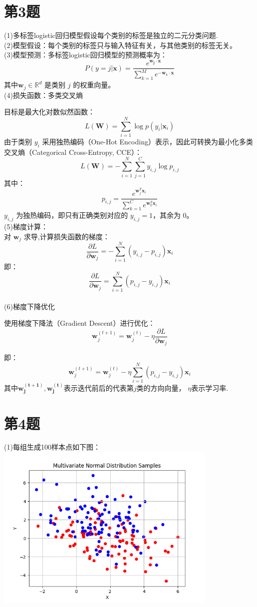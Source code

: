 \documentclass{article}
\begin{document}
\section*{第3题}
(1)多标签logistic回归模型假设每个类别的标签是独立的二元分类问题.\\
(2)模型假设：每个类别的标签只与输入特征有关，与其他类别的标签无关。\\
(3)模型预测：多标签logistic回归模型的预测概率为：
\[
P(y=j | \boldsymbol{x}) = \frac{e^{\boldsymbol{w_j}\cdot \boldsymbol{x}}}{\sum_{k=1}^{M} e^{-\mathbf{w}_k\cdot \mathbf{x}}}
\]
其中\( \mathbf{w}_j \in \mathbb{R}^d \) 是类别 \( j \) 的权重向量。\\
(4)损失函数：多类交叉熵

目标是最大化对数似然函数：
\[
L(\mathbf{W}) = \sum_{i=1}^{N} \log p(y_i | \mathbf{x}_i)
\]
由于类别 \( y_i \) 采用独热编码（One-Hot Encoding）表示，因此可转换为最小化多类交叉熵（Categorical Cross-Entropy, CCE）：
\[
L(\mathbf{W}) = - \sum_{i=1}^{N} \sum_{j=1}^{C} y_{i,j} \log p_{i,j}
\]
其中：
\[
p_{i,j} = \frac{e^{\mathbf{w}_j^T \mathbf{x}_i}}{\sum_{k=1}^{C} e^{\mathbf{w}_k^T \mathbf{x}_i}}
\]
\( y_{i,j} \) 为独热编码，即只有正确类别对应的 \( y_{i,j} = 1 \)，其余为 0。\\
(5)梯度计算：\\
对 \( \mathbf{w}_j \) 求导,计算损失函数的梯度：
\[
\frac{\partial L}{\partial \mathbf{w}_j} = - \sum_{i=1}^{N} \left( y_{i,j} - p_{i,j} \right) \mathbf{x}_i
\]
即：
\[
\frac{\partial L}{\partial \mathbf{w}_j} = \sum_{i=1}^{N} \left( p_{i,j} - y_{i,j} \right) \mathbf{x}_i
\]\\
(6)梯度下降优化

使用梯度下降法（Gradient Descent）进行优化：
\[
\mathbf{w}_j^{(t+1)} = \mathbf{w}_j^{(t)} - \eta \frac{\partial L}{\partial \mathbf{w}_j}
\]

即：
\[
\mathbf{w}_j^{(t+1)} = \mathbf{w}_j^{(t)} - \eta \sum_{i=1}^{N} \left( p_{i,j} - y_{i,j} \right) \mathbf{x}_i
\]
其中$\boldsymbol{w_j^{(t+1)}},\boldsymbol{w_j^{(t)}}$表示迭代前后的代表第$j$类的方向向量， $\eta$表示学习率.
\section*{第4题}

(1)每组生成100样本点如下图：\\
\includegraphics[width=0.8\textwidth]{4(1)散点图.png}
\end{document}
